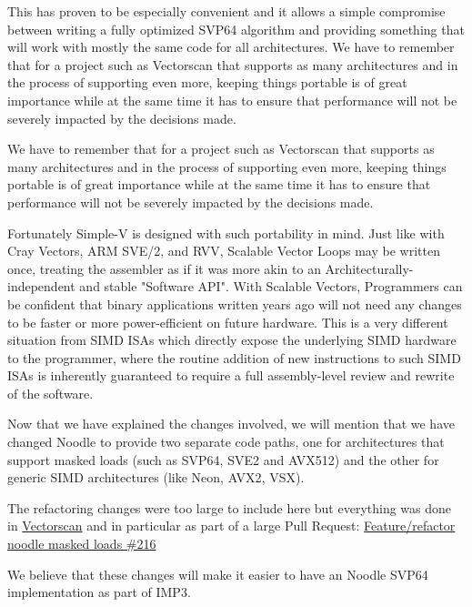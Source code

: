 This has proven to be especially convenient and it allows a simple compromise between writing a fully optimized \acrshort{SVP64} algorithm
and providing something that will work with mostly the same code for all architectures.
We have to remember that for a project such as Vectorscan that supports as many architectures
and in the process of supporting even more, keeping things portable is of great importance
while at the same time it has to ensure that performance will not be severely impacted by the decisions made.
\par

We have to remember that for a project such as Vectorscan that supports as
many architectures and in the process of supporting even more, keeping
things portable is of great importance while at the same time it has
to ensure that performance will not be severely impacted
by the decisions made. \par

Fortunately Simple-V is designed with such portability in mind. Just like
with Cray Vectors, \acrshort{ARM} SVE/2, and \acrfull{RVV}, Scalable Vector Loops
may be written once, treating the assembler as if it was more
akin to an Architecturally-independent and stable "Software \acrshort{API}".
With Scalable Vectors, Programmers can be confident
that binary applications written years ago will not need any changes
to be faster or more power-efficient on future hardware. This is a very
different situation from \acrshort{SIMD} \acrshort{ISA}s which directly expose the
underlying \acrshort{SIMD} hardware to the programmer, where the routine addition
of new instructions to such \acrshort{SIMD} \acrshort{ISA}s is inherently guaranteed to require
a full assembly-level review and rewrite of the software. \par

Now that we have explained the changes involved, we will mention that we have changed Noodle to provide two separate code paths,
one for architectures that support masked loads (such as \acrshort{SVP64}, \acrshort{SVE2} and \acrshort{AVX512})
and the other for generic \acrshort{SIMD} architectures (like Neon, \acrshort{AVX2}, \acrshort{VSX}).
\par

The refactoring changes were too large to include here
but everything was done in \href{https://github.com/VectorCamp/vectorscan}{Vectorscan} and in particular as part of a large Pull Request:
\href{https://github.com/VectorCamp/vectorscan/pull/216}{Feature/refactor noodle masked loads \#216}
\par

We believe that these changes will make it easier to have an Noodle \acrshort{SVP64} implementation as part of \acrshort{IMP}3.
\par
